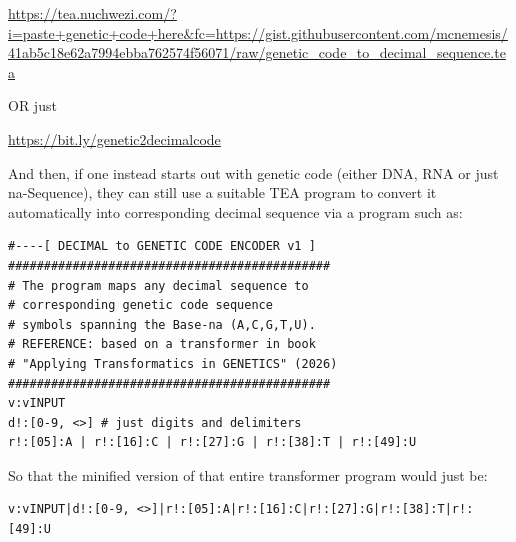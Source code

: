 \documentclass[a4paper, 18pt]{book} %
\begin{document}
 \url{https://tea.nuchwezi.com/?i=paste+genetic+code+here&fc=https://gist.githubusercontent.com/mcnemesis/41ab5c18e62a7994ebba762574f56071/raw/genetic_code_to_decimal_sequence.tea}

\vspace{1em} 

OR just

\vspace{1em} 

 \url{https://bit.ly/genetic2decimalcode}

\vspace{1em}

And then, if one instead starts out with genetic code (either DNA, RNA or just na-Sequence), they can still use a suitable TEA program to convert it automatically into corresponding decimal sequence via a program such as:


\vspace{2em}
  \begin{tcolorbox}[teaterminalstyle, title=GENETICS: DECIMAL to GENETIC CODE TRANSFORMER (v1)]
  \begin{lstlisting}[language=TEA, label=LSTDEC2GEN, caption=DEC2GEN in TEA]
#----[ DECIMAL to GENETIC CODE ENCODER v1 ]
#############################################
# The program maps any decimal sequence to
# corresponding genetic code sequence
# symbols spanning the Base-na (A,C,G,T,U).
# REFERENCE: based on a transformer in book
# "Applying Transformatics in GENETICS" (2026)
#############################################
v:vINPUT 
d!:[0-9, <>] # just digits and delimiters
r!:[05]:A | r!:[16]:C | r!:[27]:G | r!:[38]:T | r!:[49]:U
   \end{lstlisting}
  \end{tcolorbox}
\vspace{2em}


So that the minified version of that entire transformer program would just be:


\vspace{2em}
  \begin{tcolorbox}[teaterminalstyle, title=DECIMAL to GENETIC CODE TRANSFORMER (minified)]
  \begin{lstlisting}[language=TEA]
v:vINPUT|d!:[0-9, <>]|r!:[05]:A|r!:[16]:C|r!:[27]:G|r!:[38]:T|r!:[49]:U
   \end{lstlisting}
  \end{tcolorbox}
\vspace{2em}
\end{document}
